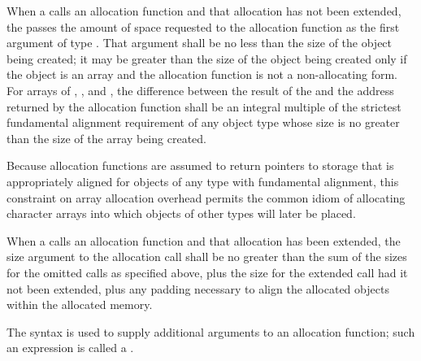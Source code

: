 \pnum
When a  calls an allocation function and that
allocation has not been extended, the
 passes the amount of space requested to the
allocation function as the first argument of type
. That argument shall be no less than the size
of the object being created; it may be greater than the size of the
object being created only if the object is an array and
the allocation function is not a non-allocating form.
For arrays of
, , and ,
the difference between the
result of the  and the address returned by the
allocation function shall be an integral multiple of the
strictest fundamental
alignment requirement of any object type whose size
is no greater than the size of the array being created.
\begin{note}
%
Because allocation functions are assumed to return pointers to storage
that is appropriately aligned for objects of any type
with fundamental alignment, this constraint
on array allocation overhead permits the common idiom of allocating
character arrays into which objects of other types will later be placed.
\end{note}

\pnum
When a  calls an allocation function and that
allocation has been extended, the size argument to the allocation call shall
be no greater than the sum of the sizes for the omitted calls as specified
above, plus the size for the extended call had it not been extended, plus any
padding necessary to align the allocated objects within the allocated memory.

\pnum
{}%
The  syntax is used to supply additional
arguments to an allocation function; such an expression is called
a .

